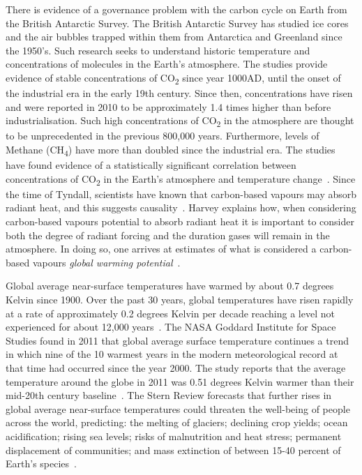 \documentclass[11pt, oneside]{book}   	%
\begin{document}
There is evidence of a governance problem with the carbon cycle on Earth from the British Antarctic Survey.
The British Antarctic Survey has studied ice cores and the air bubbles trapped within them from Antarctica and Greenland since the 1950’s.
Such research seeks to understand historic temperature and concentrations of molecules in the Earth’s atmosphere.
The studies provide evidence of stable concentrations of CO\textsubscript{2} since year 1000AD, until the onset of the industrial era in the early 19th century.
Since then, concentrations have risen and were reported in 2010 to be approximately 1.4 times higher than before industrialisation.
Such high concentrations of CO\textsubscript{2} in the atmosphere are thought to be unprecedented in the previous 800,000 years. Furthermore, levels of Methane (CH\textsubscript{4}) have more than doubled since the industrial era.
The studies have found evidence of a statistically significant correlation between concentrations of CO\textsubscript{2} in the Earth’s atmosphere and temperature change~\cite{ba1}.
Since the time of Tyndall, scientists have known that carbon-based vapours may absorb radiant heat, and this suggests causality~\cite{td1}.
Harvey explains how, when considering carbon-based vapours potential to absorb radiant heat it is important to consider both the degree of radiant forcing and the duration gases will remain in the atmosphere.
In doing so, one arrives at estimates of what is considered a carbon-based vapours \emph{global warming potential}~\cite{dldh1}.\

Global average near-surface temperatures have warmed by about 0.7 degrees Kelvin since 1900.
Over the past 30 years, global temperatures have risen rapidly at a rate of approximately 0.2 degrees Kelvin per decade reaching a level not experienced for about 12,000 years~\cite{hj1}.
The NASA Goddard Institute for Space Studies found in 2011 that global average surface temperature continues a trend in which nine of the 10 warmest years in the modern meteorological record at that time had occurred since the year 2000.
The study reports that the average temperature around the globe in 2011 was 0.51 degrees Kelvin warmer than their mid-20th century baseline~\cite{candm1}.
The Stern Review forecasts that further rises in global average near-surface temperatures could threaten the well-being of people across the world, predicting: the melting of glaciers; declining crop yields; ocean acidification; rising sea levels; risks of malnutrition and heat stress; permanent displacement of communities; and mass extinction of between 15-40 percent of Earth's species~\cite{ns1}.\
\end{document}
